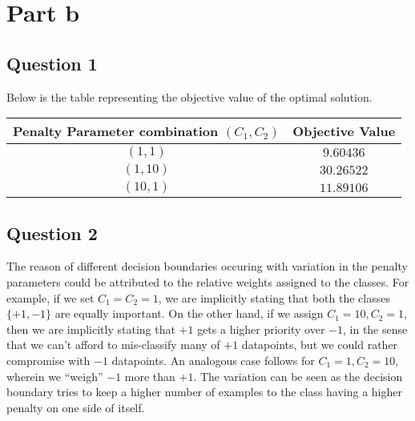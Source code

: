 \documentclass{article}
\begin{document}
\section*{Part b}
\subsection*{Question 1}
\begin{flushleft}
Below is the table representing the objective value of the optimal solution.
\begin{center}
\begin{tabular}{|c|c|}
\hline
Penalty Parameter combination \((C_{1}, C_{2})\) & Objective Value \\
\hline
\hline
\((1, 1)\) & \(9.60436\)\\
\hline
\((1, 10)\) & \(30.26522\)\\
\hline
\((10, 1)\) & \(11.89106\)\\
\hline
\end{tabular}
\end{center}
\end{flushleft}

\subsection*{Question 2}
The reason of different decision boundaries occuring with variation in the penalty parameters could be attributed to the relative weights assigned to the classes. For example, if we set \(C_{1} = C_{2} = 1\), we are implicitly stating that both the classes \(\{+1, -1\}\) are equally important. On the other hand, if we assign \(C_{1} = 10, C_{2} = 1\), then we are implicitly stating that \(+1\) gets a higher priority over \(-1\), in the sense that we can't afford to mis-classify many of \(+1\) datapoints, but we could rather compromise with \(-1\) datapoints. An analogous case follows for \(C_{1} = 1, C_{2} = 10\), wherein we ``weigh'' \(-1\) more than \(+1\). The variation can be seen as the decision boundary tries to keep a higher number of examples to the class having a higher penalty on one side of itself.
\end{document}
